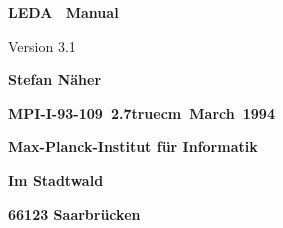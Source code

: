 
\vspace*{7cm}
\centerline{\Large\bf LEDA \ Manual}
\vspace*{0.6cm}
\centerline {\large Version 3.1}
\vspace*{1cm}
\centerline {\bf Stefan N\"aher}
\vspace*{1.1cm}
\centerline {\hbox{\bf MPI-I-93-109 \hglue 2.7truecm March 1994}}
\vspace*{3cm}
\centerline {\bf Max-Planck-Institut f\"ur Informatik}
\centerline {\bf Im Stadtwald}
\centerline {\bf 66123 Saarbr\"ucken}
\vspace*{4cm}


